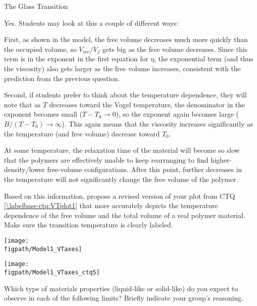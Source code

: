 \begin{activity}{The Glass Transition}
\begin{ctqs}
				\begin{solution}[2in]{}
					Yes.  Students may look at this a couple of different ways:
					
					First, as shown in the model, the free volume decreases much more quickly than the occupied volume, so $V_{occ}/V_f$ gets big as the free volume decreases.  Since this term is in the exponent in the first equation for $\eta$, the exponential term (and thus the viscosity) also gets larger as the free volume increases, consistent with the prediction from the previous question.
					
					Second, if students prefer to think about the temperature dependence, they will note that as $T$ decreases toward the Vogel temperature, the denominator in the exponent becomes small ($T-T_0\to 0$), so the exponent again becomes large ($B/(T-T_0) \to \infty$).  This again means that the viscosity increases significantly as the temperature (and free volume) decrease toward $T_0$.
				\end{solution}
	
	\clearpage
	\question At some temperature, the relaxation time of the material will become so slow that the polymers are effectively unable to keep rearranging to find higher-density/lower free-volume configurations.  After this point, further decreases in the temperature will not significantly change the free volume of the polymer. \label{\labelbase:ctq:traptemp}
	
		Based on this information, propose a revised version of your plot from CTQ \ref{\labelbase:ctq:VTplot1} that more accurately depicts the temperature dependence of the free volume and the total volume of a real polymer material.  Make sure the transition temperature is clearly labeled.
	
		\vspace{0.25in}
	
		\begin{solution}[1.5in]{
			\centerline{\texttt{[image: \\figpath/Model1\_VTaxes]}}
		}
			\centerline{\texttt{[image: \\figpath/Model1\_VTaxes\_ctq5]}}
			
		\end{solution}
		
	\question Which type of materials properties (liquid-like or solid-like) do you expect to observe in each of the following limits?  Briefly indicate your group's reasoning. \label{\labelbase:ctq:properties}
	

\end{ctqs}
\end{activity}
